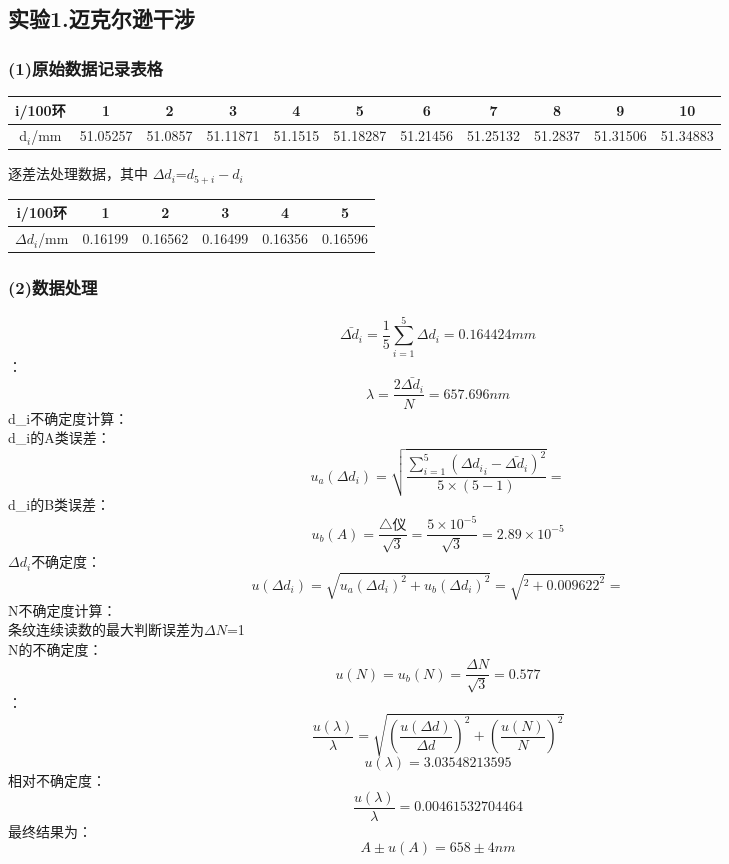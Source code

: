 \subsection*{实验1.迈克尔逊干涉}
\subsubsection*{(1)原始数据记录表格}

\begin{center}

\begin{tabular}{|c|c|c|c|c|c|c|c|c|c|c|}
\hline
i/100环 & 1 & 2 & 3 & 4 & 5 & 6 & 7 & 8 & 9 & 10\\
\hline
d$_i$/mm
&51.05257&51.0857&51.11871&51.1515&51.18287&51.21456&51.25132&51.2837&51.31506&51.34883
\\
\hline
\end{tabular}
\vspace{10pt}
逐差法处理数据，其中 ${\Delta}d_i$=$d_{5+i}-d_i$
\begin{tabular}{|c|c|c|c|c|c|}
\hline
i/100环 & 1 & 2 & 3 & 4 & 5 \\
\hline
${\Delta}d_i$/mm
&0.16199&0.16562&0.16499&0.16356&0.16596
\\
\hline
\end{tabular}
\vspace{10pt}

\end{center}

\subsubsection*{(2)数据处理}

$$\bar{{\Delta}d_i} =\frac{1}{5}\sum\limits_{i=1}^{5}{{\Delta}d_i}=0.164424mm$$
：$$\lambda=\frac{2\bar{{\Delta}d_i}}{N}=657.696nm$$
{\Delta}d_i不确定度计算：\\
{\Delta}d_i的A类误差：$$u_a({{\Delta}d_i})=\sqrt{\displaystyle\frac{\sum\limits_{i=1}^{5} ({{\Delta}d_i}_i-\bar{{\Delta}d_i})^2}{5{\times}(5-1)}}= $$
{\Delta}d_i的B类误差：$$u_b({A})=\displaystyle\frac{\bigtriangleup\text{仪}}{\sqrt{3}}
= \frac{5 \times 10^{-5}}{\sqrt{3}} =  2.89 \times 10^{-5} $$
${{\Delta}d_i}$不确定度：$$u({{\Delta}d_i})=\sqrt{{u_a({{\Delta}d_i})}^2+{u_b({{\Delta}d_i})}^2}=\sqrt{ ^2 + 0.009622^2} =  $$
N不确定度计算：\\
条纹连续读数的最大判断误差为${\Delta}N$=1\\
N的不确定度：$$u(N)=u_b(N)=\frac{{\Delta}N}{\sqrt{3}}=0.577$$
：$$\frac{u(\lambda)}{\lambda}=\sqrt{(\frac{u({\Delta}d)}{{\Delta}d})^2+(\frac{u(N)}{N})^2}$$
$$ u(\lambda) = 3.03548213595 $$
相对不确定度：$$\displaystyle\frac{u(\lambda)}{\lambda}=0.00461532704464$$
最终结果为：$$A{\pm}u(A) = 658 {\pm} 4nm$$